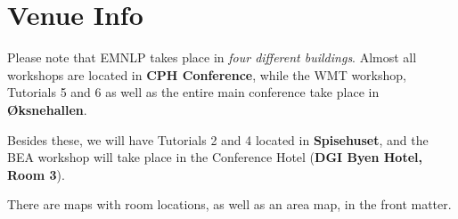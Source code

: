 \setheaders{}{}
\section{Venue Info}{}

Please note that EMNLP takes place in \textit{four different buildings}. Almost all workshops are located in \textbf{CPH Conference}, while the WMT workshop, Tutorials 5 and 6 as well as the entire main conference take place in \textbf{Øksnehallen}. 

Besides these, we will have Tutorials 2 and 4 located in \textbf{Spisehuset}, and the BEA workshop will take place in the Conference Hotel (\textbf{DGI Byen Hotel, Room 3}).

There are maps with room locations, as well as an area map, in the front matter.